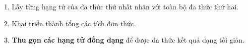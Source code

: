 \begin{enumerate}
\item Lấy từng hạng tử của đa thức thứ nhất nhân với toàn bộ đa thức thứ hai.
\item Khai triển thành tổng các tích đơn thức.
\item \textbf{Thu gọn các hạng tử đồng dạng} để được đa thức kết quả dạng tối giản.
\end{enumerate}
